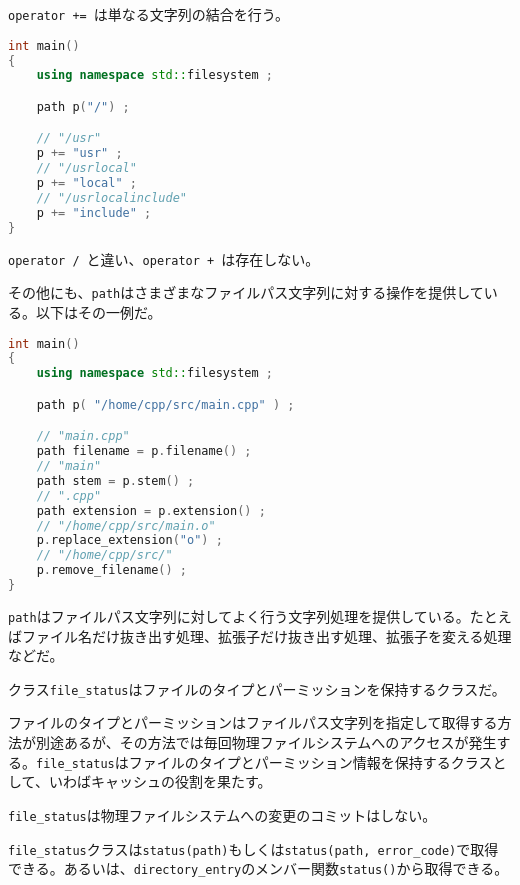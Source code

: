 \lstinline!operator +=!~は単なる文字列の結合を行う。

\begin{lstlisting}[language=C++]
int main()
{
    using namespace std::filesystem ;

    path p("/") ;

    // "/usr"
    p += "usr" ;
    // "/usrlocal"
    p += "local" ;
    // "/usrlocalinclude"
    p += "include" ;
}
\end{lstlisting}

\lstinline!operator /!~と違い、\lstinline!operator +!~は存在しない。

その他にも、\lstinline!path!はさまざまなファイルパス文字列に対する操作を提供している。以下はその一例だ。

\begin{lstlisting}[language=C++]
int main()
{
    using namespace std::filesystem ;

    path p( "/home/cpp/src/main.cpp" ) ;

    // "main.cpp"
    path filename = p.filename() ;
    // "main"
    path stem = p.stem() ;
    // ".cpp"
    path extension = p.extension() ;
    // "/home/cpp/src/main.o"
    p.replace_extension("o") ;
    // "/home/cpp/src/"
    p.remove_filename() ;
}
\end{lstlisting}

\lstinline!path!はファイルパス文字列に対してよく行う文字列処理を提供している。たとえばファイル名だけ抜き出す処理、拡張子だけ抜き出す処理、拡張子を変える処理などだ。

%

クラス\lstinline!file_status!はファイルのタイプとパーミッションを保持するクラスだ。

ファイルのタイプとパーミッションはファイルパス文字列を指定して取得する方法が別途あるが、その方法では毎回物理ファイルシステムへのアクセスが発生する。\lstinline!file_status!はファイルのタイプとパーミッション情報を保持するクラスとして、いわばキャッシュの役割を果たす。

\lstinline!file_status!は物理ファイルシステムへの変更のコミットはしない。

\lstinline!file_status!クラスは\lstinline!status(path)!もしくは\lstinline!status(path, error_code)!で取得できる。あるいは、\lstinline!directory_entry!のメンバー関数\lstinline!status()!から取得できる。

